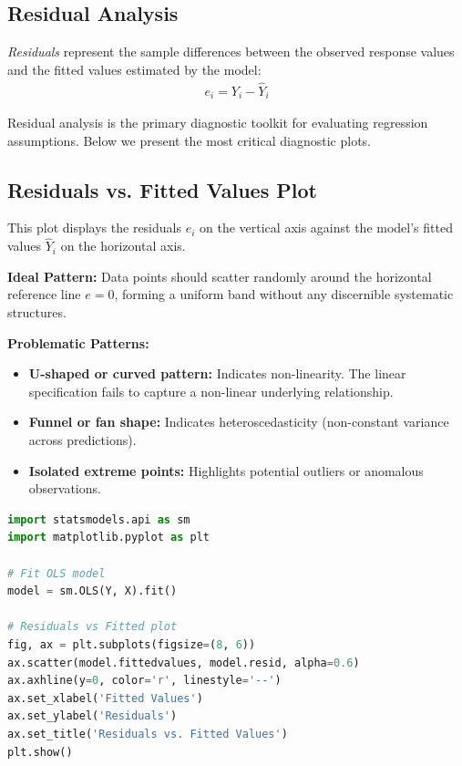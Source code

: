 \subsection{Residual Analysis}

\emph{Residuals} represent the sample differences between the observed response values and the fitted values estimated by the model:
\begin{align}
	e_i = Y_i - \hat{Y}_i
\end{align}

Residual analysis is the primary diagnostic toolkit for evaluating regression assumptions. Below we present the most critical diagnostic plots.

\subsection{Residuals vs. Fitted Values Plot}

This plot displays the residuals $e_i$ on the vertical axis against the model's fitted values $\hat{Y}_i$ on the horizontal axis.

\textbf{Ideal Pattern:} Data points should scatter randomly around the horizontal reference line $e = 0$, forming a uniform band without any discernible systematic structures.

\textbf{Problematic Patterns:}
\begin{itemize}
	\item \textbf{U-shaped or curved pattern:} Indicates non-linearity. The linear specification fails to capture a non-linear underlying relationship.
	\item \textbf{Funnel or fan shape:} Indicates heteroscedasticity (non-constant variance across predictions).
	\item \textbf{Isolated extreme points:} Highlights potential outliers or anomalous observations.
\end{itemize}

\begin{lstlisting}[language=Python]
import statsmodels.api as sm
import matplotlib.pyplot as plt

# Fit OLS model
model = sm.OLS(Y, X).fit()

# Residuals vs Fitted plot
fig, ax = plt.subplots(figsize=(8, 6))
ax.scatter(model.fittedvalues, model.resid, alpha=0.6)
ax.axhline(y=0, color='r', linestyle='--')
ax.set_xlabel('Fitted Values')
ax.set_ylabel('Residuals')
ax.set_title('Residuals vs. Fitted Values')
plt.show()
\end{lstlisting}

